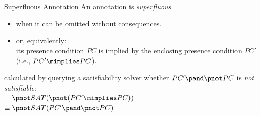 \begin{frame}[b,fragile]{\myframetitle}
	\vspace*{-4ex}
	\begin{fancycolumns}[t,columns=3,widths={40,23,37},animation=none]
		\begin{definition}{Superfluous Annotation}
			An annotation is \emph{superfluous}

			\begin{itemize}
				\item when it can be omitted without consequences.
				\item or, equivalently:\\
					its presence condition $PC$ is implied by the enclosing presence condition $PC'$ (i.e., $PC' \mimplies PC$).
			\end{itemize}
		\end{definition}
		\begin{note}{}
			calculated by querying a satisfiability solver whether $PC' \pand \pnot PC$ is \emph{not satisfiable}:\\
			$\phantom{\equiv{}} \pnot SAT(\pnot(PC' \mimplies PC))$\\
			$\equiv{} \pnot SAT(PC' \pand \pnot PC)$
		\end{note}
	\nextcolumn
\end{fancycolumns}
\end{frame}
